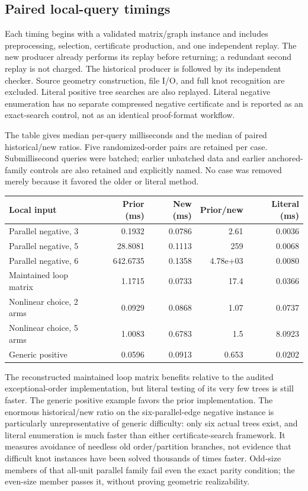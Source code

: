 \documentclass[11pt,letterpaper]{article}
\theoremstyle{definition}
\begin{document}
\subsection{Paired local-query timings}
Each timing begins with a validated matrix/graph instance and includes
preprocessing, selection, certificate production, and one independent
replay. The new producer already performs its replay before returning;
a redundant second replay is not charged. The historical producer is
followed by its independent checker. Source geometry construction, file
I/O, and full knot recognition are excluded. Literal positive tree searches
are also replayed. Literal negative enumeration has no separate compressed
negative certificate and is reported as an exact-search control, not as
an identical proof-format workflow.

The table gives median per-query milliseconds and the median of paired
historical/new ratios. Five randomized-order pairs are retained per case.
Submillisecond queries were batched; earlier unbatched data and earlier
anchored-family controls are also retained and explicitly named. No case
was removed merely because it favored the older or literal method.

\begin{center}\small\setlength{\tabcolsep}{5pt}
\begin{tabular}{lrrrr}\toprule
Local input & Prior (ms) & New (ms) & Prior/new & Literal (ms)\\\midrule
Parallel negative, 3 & 0.1932 & 0.0786 & 2.61 & 0.0036\\
Parallel negative, 5 & 28.8081 & 0.1113 & 259 & 0.0068\\
Parallel negative, 6 & 642.6735 & 0.1358 & 4.78e+03 & 0.0080\\
Maintained loop matrix & 1.1715 & 0.0733 & 17.4 & 0.0366\\
Nonlinear choice, 2 arms & 0.0929 & 0.0868 & 1.07 & 0.0737\\
Nonlinear choice, 5 arms & 1.0083 & 0.6783 & 1.5 & 8.0923\\
Generic positive & 0.0596 & 0.0913 & 0.653 & 0.0202\\
\bottomrule\end{tabular}\end{center}

The reconstructed maintained loop matrix benefits relative to the audited
exceptional-order implementation, but literal testing of its very few trees
is still faster. The generic positive example favors the prior implementation.
The enormous historical/new ratio on the six-parallel-edge negative instance
is particularly unrepresentative of generic difficulty: only six actual trees
exist, and literal enumeration is much faster than either certificate-search
framework. It measures avoidance of needless old order/partition branches,
not evidence that difficult knot instances have been solved thousands of
times faster. Odd-size members of that all-unit parallel family fail even
the exact parity condition; the even-size member passes it, without proving
geometric realizability.
\end{document}
